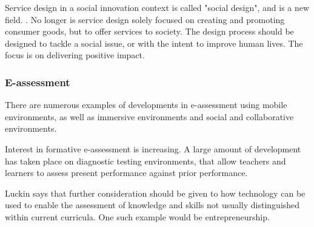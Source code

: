     Service design in a social innovation context is called "social design", and is a new field. \cite{stickdorn}. No longer is service design solely focused on creating and promoting consumer goods, but to offer services to society. The design process should be designed to tackle a social issue, or with the intent to improve human lives. The focus is on delivering positive impact.

    \subsubsection{E-assessment}
    There are numerous examples of developments in e-assessment using mobile environments, as well as immersive environments and social and collaborative environments.

    Interest in formative e-assessment is increasing. A large amount of development has taken place on diagnostic testing environments, that allow teachers and learners to assess present performance against prior performance. \cite{luckin}

    Luckin says that further consideration should  be given to how technology can be used to enable the assessment of knowledge and skills not usually distinguished within current curricula. \cite{luckin} One such example would be entrepreneurship.

    

